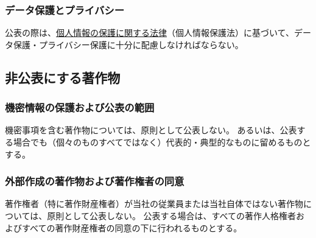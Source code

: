 \subsubsection{データ保護とプライバシー}
公表の際は、\href{https://elaws.e-gov.go.jp/document?lawid=415AC0000000057}{個人情報の保護に関する法律}（個人情報保護法）\cite{onoline:eGovPersonalInfoProtectionLaw}に基づいて、データ保護・プライバシー保護に十分に配慮しなければならない。


\subsection{非公表にする著作物}

\subsubsection{機密情報の保護および公表の範囲\label{subsec:openwork}}
機密事項を含む著作物については、原則として公表しない。
あるいは、公表する場合でも（個々のものすべてではなく）代表的・典型的なものに留めるものとする。

\subsubsection{外部作成の著作物および著作権者の同意\label{subsec:tulescopyrightsSubcontractor}}
著作権者（特に著作財産権者）が当社の従業員または当社自体ではない著作物については、原則として公表しない。
公表する場合は、すべての著作人格権者およびすべての著作財産権者の同意の下に行われるものとする。

